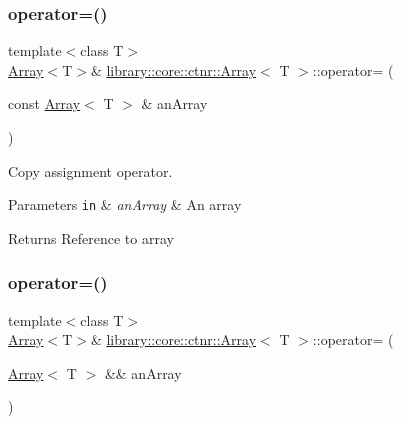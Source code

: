 \subsubsection{\texorpdfstring{operator=()}{operator=()}\hspace{0.1cm}{\footnotesize\ttfamily [1/2]}}
{\footnotesize\ttfamily template$<$class T$>$ \\
\hyperlink{classlibrary_1_1core_1_1ctnr_1_1_array}{Array}$<$T$>$\& \hyperlink{classlibrary_1_1core_1_1ctnr_1_1_array}{library\+::core\+::ctnr\+::\+Array}$<$ T $>$\+::operator= (\begin{DoxyParamCaption}\item[{const \hyperlink{classlibrary_1_1core_1_1ctnr_1_1_array}{Array}$<$ T $>$ \&}]{an\+Array }\end{DoxyParamCaption})\hspace{0.3cm}{\ttfamily [default]}}



Copy assignment operator. 


\begin{DoxyParams}[1]{Parameters}
\mbox{\tt in}  & {\em an\+Array} & An array \\
\hline
\end{DoxyParams}
\begin{DoxyReturn}{Returns}
Reference to array 
\end{DoxyReturn}
\mbox{\label{classlibrary_1_1core_1_1ctnr_1_1_array_a19f569e480439d489cf280678899498e}} 
\subsubsection{\texorpdfstring{operator=()}{operator=()}\hspace{0.1cm}{\footnotesize\ttfamily [2/2]}}
{\footnotesize\ttfamily template$<$class T$>$ \\
\hyperlink{classlibrary_1_1core_1_1ctnr_1_1_array}{Array}$<$T$>$\& \hyperlink{classlibrary_1_1core_1_1ctnr_1_1_array}{library\+::core\+::ctnr\+::\+Array}$<$ T $>$\+::operator= (\begin{DoxyParamCaption}\item[{\hyperlink{classlibrary_1_1core_1_1ctnr_1_1_array}{Array}$<$ T $>$ \&\&}]{an\+Array }\end{DoxyParamCaption})\hspace{0.3cm}{\ttfamily [default]}}



